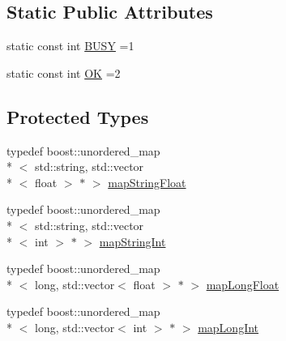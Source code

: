 \subsection*{Static Public Attributes}
\begin{DoxyCompactItemize}
\item 
static const int \hyperlink{classccmc_1_1_model_a2455ad851ac80f63d5d0af2c6c77cfcc}{B\-U\-S\-Y} =1
\item 
static const int \hyperlink{classccmc_1_1_model_a0a921cfb116d7b5e8e7b49b42c151f18}{O\-K} =2
\end{DoxyCompactItemize}
\subsection*{Protected Types}
\begin{DoxyCompactItemize}
\item 
typedef boost\-::unordered\-\_\-map\\*
$<$ std\-::string, std\-::vector\\*
$<$ float $>$ $\ast$ $>$ \hyperlink{classccmc_1_1_model_a0569e60cc0eab011a5ec40f927e1c307}{map\-String\-Float}
\item 
typedef boost\-::unordered\-\_\-map\\*
$<$ std\-::string, std\-::vector\\*
$<$ int $>$ $\ast$ $>$ \hyperlink{classccmc_1_1_model_a83a7b0a5b5aee6a6058f8c6bf4f51dec}{map\-String\-Int}
\item 
typedef boost\-::unordered\-\_\-map\\*
$<$ long, std\-::vector$<$ float $>$ $\ast$ $>$ \hyperlink{classccmc_1_1_model_ad5da02fd8e4dcfbd4c0425ae6cfdc829}{map\-Long\-Float}
\item 
typedef boost\-::unordered\-\_\-map\\*
$<$ long, std\-::vector$<$ int $>$ $\ast$ $>$ \hyperlink{classccmc_1_1_model_aacb96d67a660454a3287439db8b474a7}{map\-Long\-Int}
\end{DoxyCompactItemize}
